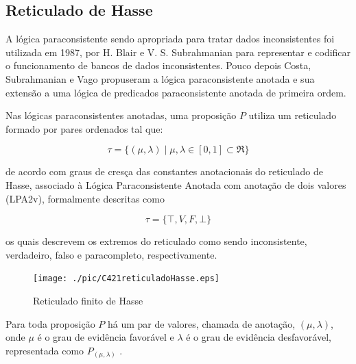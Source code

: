 


\subsection{Reticulado de Hasse}

A lógica paraconsistente sendo apropriada para tratar dados inconsistentes foi utilizada em 1987, por H. Blair e V. S. Subrahmanian para representar e codificar o funcionamento de bancos de dados inconsistentes. Pouco depois Costa, Subrahmanian e Vago propuseram a lógica paraconsistente anotada e sua extensão a uma lógica de predicados paraconsistente anotada de primeira ordem. 

Nas lógicas paraconsistentes anotadas, uma proposição $P$ utiliza um reticulado formado por pares ordenados tal que: 

\begin{center}
\begin{equation}
\tau = \{ ( \mu , \lambda ) \mid \mu ,\lambda \in [0,1] \subset \Re \}
\end{equation}
\end{center}

de acordo com graus de cresça das constantes anotacionais do reticulado de Hasse, associado à Lógica Paraconsistente Anotada com anotação de dois valores (LPA2v), formalmente descritas como 

\begin{center}
\begin{equation}
  \tau = \{ \top , V, F, \bot \}
\end{equation}
\end{center}

os quais descrevem os extremos do reticulado como sendo inconsistente, verdadeiro, falso e paracompleto, respectivamente. 

\begin{figure}[!htb]
\center\texttt{[image: ./pic/C421reticuladoHasse.eps]}
\caption{Reticulado finito de Hasse}
\label{fig:reticuladoHasse}
\end{figure}

Para toda proposição $P$ há um par de valores, chamada de anotação, $(\mu , \lambda )$, onde $\mu$ é o grau de evidência favorável e $\lambda $ é o grau de evidência desfavorável, representada como  $P_{( \mu , \lambda )}$ .

